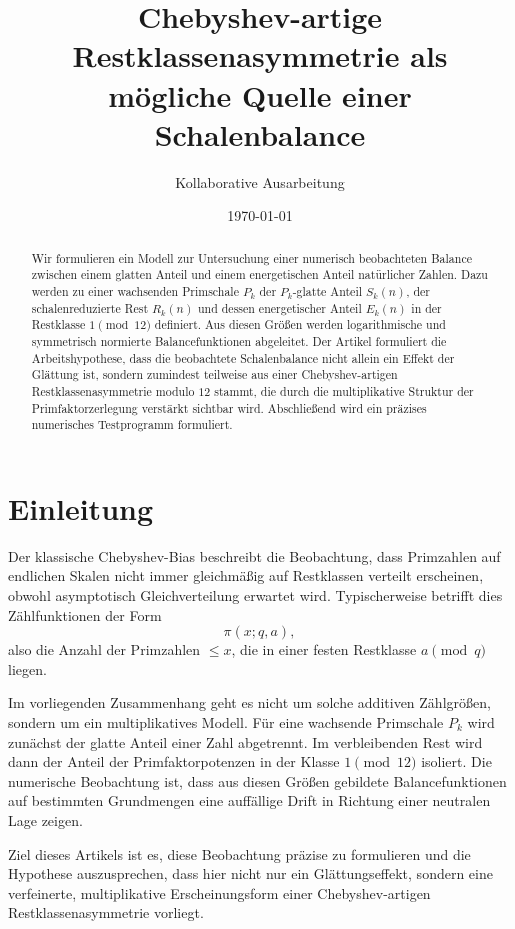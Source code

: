 \documentclass[11pt,a4paper]{article}
\title{Chebyshev-artige Restklassenasymmetrie als mögliche Quelle einer Schalenbalance}
\author{Kollaborative Ausarbeitung}
\date{\today}
\theoremstyle{definition}
\theoremstyle{remark}
\begin{document}
	\maketitle
	
	\begin{abstract}
		Wir formulieren ein Modell zur Untersuchung einer numerisch beobachteten Balance zwischen
		einem glatten Anteil und einem energetischen Anteil natürlicher Zahlen. Dazu werden zu einer
		wachsenden Primschale \(P_k\) der \(P_k\)-glatte Anteil \(S_k(n)\), der schalenreduzierte Rest
		\(R_k(n)\) und dessen energetischer Anteil \(E_k(n)\) in der Restklasse \(1 \pmod{12}\)
		definiert. Aus diesen Größen werden logarithmische und symmetrisch normierte Balancefunktionen
		abgeleitet. Der Artikel formuliert die Arbeitshypothese, dass die beobachtete Schalenbalance
		nicht allein ein Effekt der Glättung ist, sondern zumindest teilweise aus einer
		Chebyshev-artigen Restklassenasymmetrie modulo \(12\) stammt, die durch die multiplikative
		Struktur der Primfaktorzerlegung verstärkt sichtbar wird. Abschließend wird ein präzises
		numerisches Testprogramm formuliert.
	\end{abstract}
	
	\section{Einleitung}
	
	Der klassische Chebyshev-Bias beschreibt die Beobachtung, dass Primzahlen auf endlichen Skalen
	nicht immer gleichmäßig auf Restklassen verteilt erscheinen, obwohl asymptotisch Gleichverteilung
	erwartet wird. Typischerweise betrifft dies Zählfunktionen der Form
	\[
	\pi(x;q,a),
	\]
	also die Anzahl der Primzahlen \(\le x\), die in einer festen Restklasse \(a \pmod q\) liegen.
	
	Im vorliegenden Zusammenhang geht es nicht um solche additiven Zählgrößen, sondern um ein
	multiplikatives Modell. Für eine wachsende Primschale \(P_k\) wird zunächst der glatte Anteil
	einer Zahl abgetrennt. Im verbleibenden Rest wird dann der Anteil der Primfaktorpotenzen in der
	Klasse \(1 \pmod{12}\) isoliert. Die numerische Beobachtung ist, dass aus diesen Größen gebildete
	Balancefunktionen auf bestimmten Grundmengen eine auffällige Drift in Richtung einer neutralen
	Lage zeigen.
	
	Ziel dieses Artikels ist es, diese Beobachtung präzise zu formulieren und die Hypothese
	auszusprechen, dass hier nicht nur ein Glättungseffekt, sondern eine verfeinerte,
	multiplikative Erscheinungsform einer Chebyshev-artigen Restklassenasymmetrie vorliegt.
	
\end{document}
